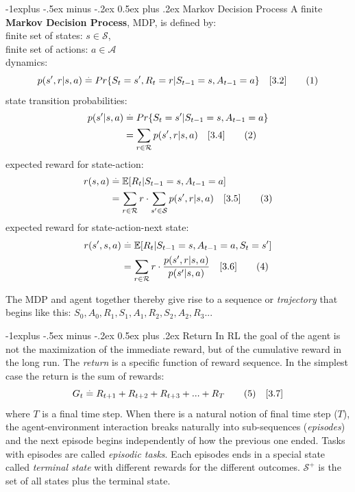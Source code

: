 \documentclass[10pt,landscape]{article}
\makeatletter
\renewcommand{\subsection}{\@startsection{subsection}{2}{0mm}%
                                {-1explus -.5ex minus -.2ex}%
                                {0.5ex plus .2ex}%
                                {\normalfont\normalsize\bfseries}}
\newcommand\numberthis{\addtocounter{equation}{1}\tag{\theequation}}
\makeatother
\begin{document}
\begin{multicols}{3}
\subsection{Markov Decision Process}
A finite \textbf{Markov Decision Process}, MDP, is defined by:	\\
finite set of states:  $s \in \mathcal{S}$, \\
finite set of actions: $a \in \mathcal{A}$ \\
dynamics: 
\begin{equation}
p(s', r | s, a) \stackrel{.}{=} Pr \{S_{t} = s', R_{t} = r | S_{t-1} = s, A_{t-1} = a \} \quad [3.2] \numberthis
\end{equation}
state transition probabilities: 
\begin{align*}
p(s' | s, a) & \stackrel{.}{=} Pr \{S_{t} = s' | S_{t-1} = s, A_{t-1} = a \} \\
& = \sum_{r \in \mathcal{R}} p(s', r | s, a) \quad [3.4]  \numberthis
\end{align*}
expected reward for state-action:
\begin{align*}
r(s, a) & \stackrel{.}{=} \mathbb{E}[ R_{t} | S_{t-1} = s, A_{t-1} = a ] \\
 & = \sum_{r \in \mathcal{R}} r \cdot \sum_{s' \in \mathcal{S}} p(s', r | s, a) \quad [3.5]  \numberthis
\end{align*}
expected reward for state-action-next state: 
\begin{align*}
r(s',s, a) & \stackrel{.}{=} \mathbb{E}[ R_{t} | S_{t-1} = s, A_{t-1} = a, S_{t} = s' ] \\
& = \sum_{r \in \mathcal{R}} r \cdot \frac{p(s', r | s, a)}{p(s' | s,a)} \quad [3.6] \numberthis
\end{align*}

The MDP and agent together thereby give rise to a sequence or \emph{trajectory} that begins like this:
$S_0,A_0,R_1,S_1,A_1,R_2,S_2,A_2,R_3...$

\subsection{Return}
In RL the goal of the agent is not the maximization of the immediate reward, but of the cumulative reward in the long run. The \emph{return} is a specific function of reward sequence. In the simplest case the return is the sum of rewards: 
\begin{equation}
G_t \stackrel{.}{=} R_{t+1} + R_{t+2} + R_{t+3} + ... +  R_{T} \numberthis \label{eq:return_1} \quad [3.7]
\end{equation}
where $T$ is a final time step.
When there is a natural notion of final time step ($T$), the agent-environment interaction breaks naturally into sub-sequences (\emph{episodes}) and the next episode begins independently of how the previous one ended. Tasks with episodes are called \emph{episodic tasks}. Each episodes ends in a special state called \emph{terminal state} with different rewards for the different outcomes.  $\mathcal{S}^{+}$ is the set of all states plus the terminal state.


\end{multicols}
\end{document}

